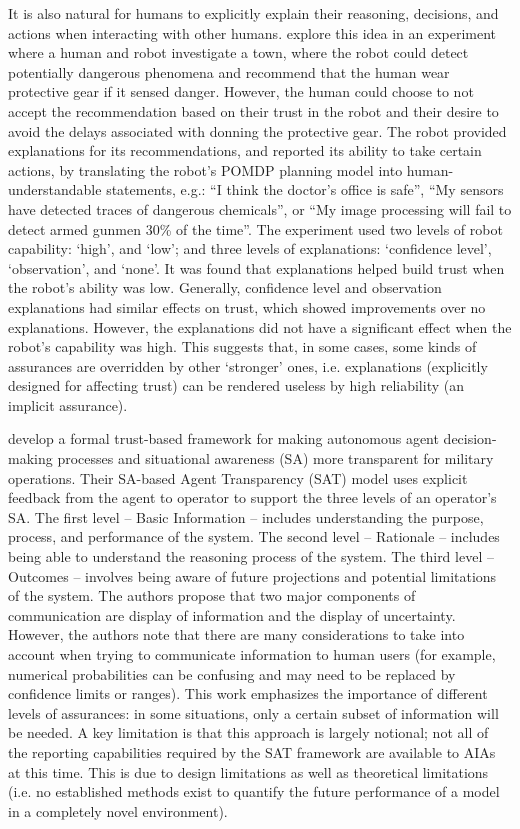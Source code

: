 It is also natural for humans to explicitly explain their reasoning, decisions, and actions when interacting with other humans. 
\citet{Wang2016-id} explore this idea in an experiment where a human and robot investigate a town, where the robot could detect potentially dangerous phenomena and recommend that the human wear protective gear if it sensed danger. 
However, the human could choose to not accept the recommendation based on their trust in the robot and their desire to avoid the delays associated with donning the protective gear. 
The robot provided explanations for its recommendations, and reported its ability to take certain actions, by translating the robot's POMDP planning model into human-understandable statements, e.g.: ``I think the doctor's office is safe'', ``My sensors have detected traces of dangerous chemicals'', or ``My image processing will fail to detect armed gunmen 30\% of the time''. 
The experiment used two levels of robot capability: `high', and `low'; and three levels of explanations: `confidence level', `observation', and `none'. 
It was found that explanations helped build trust when the robot's ability was low. 
Generally, confidence level and observation explanations had similar effects on trust, which showed improvements over no explanations. 
However, the explanations did not have a significant effect when the robot's capability was high. 
This suggests that, in some cases, some kinds of assurances are overridden by other `stronger' ones, i.e.  explanations (explicitly designed for affecting trust) can be rendered useless by high reliability (an implicit assurance). 

\citet{Chen2014-dk} develop a formal trust-based framework for making autonomous agent decision-making processes and situational awareness (SA) \cite{Endsley1995-ie} more transparent for military operations. Their SA-based Agent Transparency (SAT) model uses explicit feedback from the agent to operator to support the three levels of an operator's SA. 
The first level -- Basic Information -- includes understanding the purpose, process, and performance of the system. 
The second level -- Rationale -- includes being able to understand the reasoning process of the system. 
The third level -- Outcomes -- involves being aware of future projections and potential limitations of the system. 
The authors propose that two major components of communication are display of information and the display of uncertainty. 
However, the authors note that there are many considerations to take into account when trying to communicate information to human users (for example, numerical probabilities can be confusing and may need to be replaced by confidence limits or ranges). 
This work emphasizes the importance of different levels of assurances: in some situations, only a certain subset of information will be needed. 
A key limitation is that this approach is largely notional; not all of the reporting capabilities required by the SAT framework are available to AIAs at this time. 
This is due to design limitations as well as theoretical limitations (i.e. no established methods exist to quantify the future performance of a model in a completely novel environment). 

